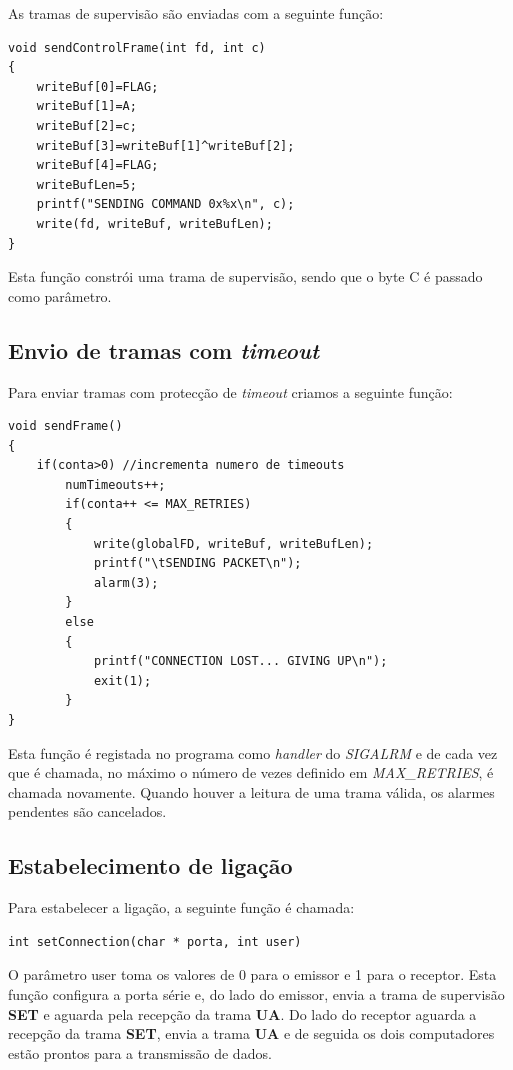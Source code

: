 \documentclass[a4paper,11pt]{article}
\begin{document}
As tramas de supervisão são enviadas com a seguinte função:\\

\lstset{language=C,
		showstringspaces=false,
		caption=,
		frame=tb}
		
\begin{lstlisting}
void sendControlFrame(int fd, int c)
{
    writeBuf[0]=FLAG;
    writeBuf[1]=A;
    writeBuf[2]=c;
    writeBuf[3]=writeBuf[1]^writeBuf[2];
    writeBuf[4]=FLAG;
    writeBufLen=5;
    printf("SENDING COMMAND 0x%x\n", c);
    write(fd, writeBuf, writeBufLen);  
}
\end{lstlisting}

Esta função constrói uma trama de supervisão, sendo que o byte C é passado como parâmetro.
\pagebreak
\subsection{Envio de tramas com \textit{timeout}}

Para enviar tramas com protecção de \textit{timeout} criamos a seguinte função:

\begin{lstlisting}
void sendFrame()
{
    if(conta>0) //incrementa numero de timeouts
        numTimeouts++;
        if(conta++ <= MAX_RETRIES)
        {
            write(globalFD, writeBuf, writeBufLen);
            printf("\tSENDING PACKET\n");
            alarm(3);
        }
        else
        {
            printf("CONNECTION LOST... GIVING UP\n");
            exit(1);
        }
}
\end{lstlisting}

Esta função é registada no programa como \textit{handler} do \textit{SIGALRM} e de cada vez que é chamada, no máximo o número de vezes definido em \textit{MAX\_RETRIES}, é chamada novamente.
Quando houver a leitura de uma trama válida, os alarmes pendentes são cancelados.

\subsection{Estabelecimento de ligação}

Para estabelecer a ligação, a seguinte função é chamada:\\
		
\begin{lstlisting}
int setConnection(char * porta, int user)
\end{lstlisting}

O parâmetro user toma os valores de 0 para o emissor e 1 para o receptor.
Esta função configura a porta série e, do lado do emissor, envia a trama de supervisão \textbf{SET} e aguarda pela recepção da trama \textbf{UA}.
Do lado do receptor aguarda a recepção da trama \textbf{SET}, envia a trama \textbf{UA} e de seguida os dois computadores estão prontos para a transmissão de dados.
\end{document}
